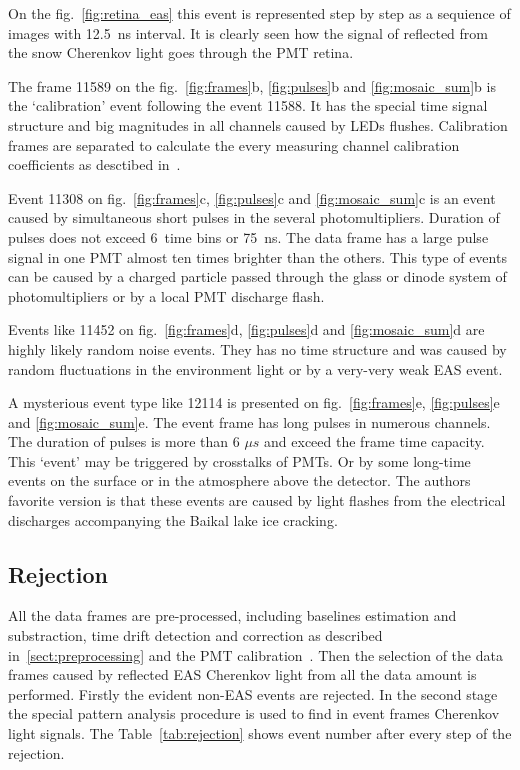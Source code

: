 \documentclass[final,5p,times,twocolumn]{elsarticle}
\begin{document}
On the fig.~\ref{fig:retina_eas} this event is represented step by step as a sequience of images with 12.5~ns interval. It is clearly seen how the signal of reflected from the snow Cherenkov light goes through the PMT retina.

The frame 11589 on the fig.~\ref{fig:frames}b, \ref{fig:pulses}b and \ref{fig:mosaic_sum}b is the `calibration' event following the event 11588. It has the special time signal structure and big magnitudes in all channels caused by LEDs flushes. Calibration frames are separated to calculate the every measuring channel calibration coefficients as desctibed in~\cite{Ant16}.

Event 11308 on fig.~\ref{fig:frames}c, \ref{fig:pulses}c and \ref{fig:mosaic_sum}c is an event caused by simultaneous short pulses in the several photomultipliers. Duration of pulses does not exceed 6~time bins or 75~ns. The data frame has a large pulse signal in one PMT almost ten times brighter than the others. This type of events can be caused by a charged particle passed through the glass or dinode system of photomultipliers or by a local PMT discharge flash.  

Events like 11452 on fig.~\ref{fig:frames}d, \ref{fig:pulses}d and \ref{fig:mosaic_sum}d are highly likely random noise events. They has no time structure and was caused by random fluctuations in the environment light or by a very-very weak EAS event. 

A mysterious event type like 12114 is presented on fig.~\ref{fig:frames}e, \ref{fig:pulses}e and \ref{fig:mosaic_sum}e. The event frame has long pulses in numerous channels. The duration of pulses is more than 6 ${\mu}s$ and exceed the frame time capacity.  This `event' may be triggered by crosstalks of PMTs. Or by some long-time events on the surface or in the atmosphere above the detector. The authors favorite version is that these events are caused by light flashes from the electrical discharges accompanying the Baikal lake ice cracking.


\subsection{Rejection}

All the data frames are pre-processed, including baselines estimation and substraction, time drift detection and correction as described in~\ref{sect:preprocessing} and the PMT calibration~\cite{Ant16}. Then the  selection of the data frames caused by reflected EAS Cherenkov light from all the data amount is performed. Firstly the evident non-EAS events are rejected. In the second stage the special pattern analysis procedure is used to find in event frames Cherenkov light signals. The Table~\ref{tab:rejection} shows event number after every step of the rejection. 
\end{document}
